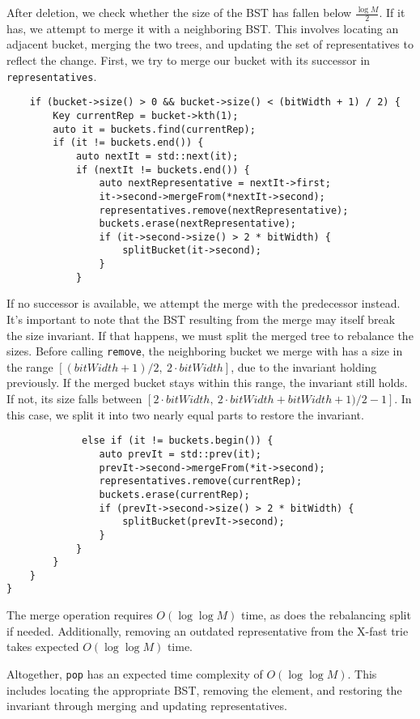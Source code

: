 After deletion, we check whether the size of the BST has fallen below \( \frac{\log M}{2} \). If it has, we attempt to merge it with a neighboring BST. This involves locating an adjacent bucket, merging the two trees, and updating the set of representatives to reflect the change. First, we try to merge our bucket with its successor in \texttt{representatives}.

\begin{verbatim}
    if (bucket->size() > 0 && bucket->size() < (bitWidth + 1) / 2) {
        Key currentRep = bucket->kth(1);
        auto it = buckets.find(currentRep);
        if (it != buckets.end()) {
            auto nextIt = std::next(it);
            if (nextIt != buckets.end()) {
                auto nextRepresentative = nextIt->first;
                it->second->mergeFrom(*nextIt->second);
                representatives.remove(nextRepresentative);
                buckets.erase(nextRepresentative);
                if (it->second->size() > 2 * bitWidth) {
                    splitBucket(it->second);
                }
            }
\end{verbatim}

If no successor is available, we attempt the merge with the predecessor instead. It's important to note that the BST resulting from the merge may itself break the size invariant. If that happens, we must split the merged tree to rebalance the sizes. Before calling \texttt{remove}, the neighboring bucket we merge with has a size in the range \([(bitWidth + 1)/2,\ 2 \cdot bitWidth ]\), due to the invariant holding previously. If the merged bucket stays within this range, the invariant still holds. If not, its size falls between \([ 2 \cdot bitWidth,\ 2 \cdot bitWidth + bitWidth + 1)/2 - 1 ]\). In this case, we split it into two nearly equal parts to restore the invariant.

\begin{verbatim}
             else if (it != buckets.begin()) {
                auto prevIt = std::prev(it);
                prevIt->second->mergeFrom(*it->second);
                representatives.remove(currentRep);
                buckets.erase(currentRep);
                if (prevIt->second->size() > 2 * bitWidth) {
                    splitBucket(prevIt->second);
                }
            }
        }
    }
}
\end{verbatim}

The merge operation requires \( O(\log \log M) \) time, as does the rebalancing split if needed. Additionally, removing an outdated representative from the X-fast trie takes expected \( O(\log \log M) \) time.

Altogether, \texttt{pop} has an expected time complexity of \( O(\log \log M) \). This includes locating the appropriate BST, removing the element, and restoring the invariant through merging and updating representatives.
